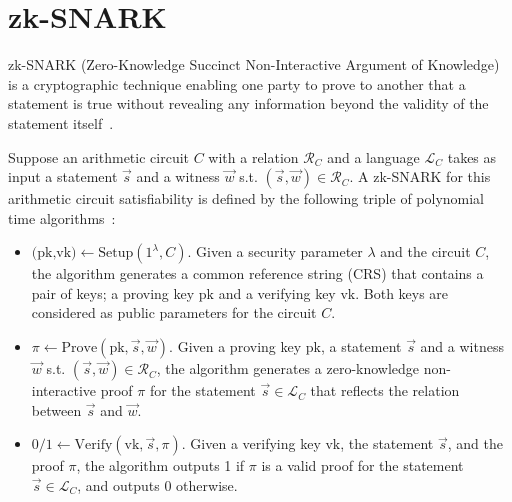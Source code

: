 \documentclass[runningheads]{llncs}
\begin{document}
\section{zk-SNARK}
zk-SNARK (Zero-Knowledge Succinct Non-Interactive Argument of Knowledge) is a cryptographic technique enabling one party to prove to another that a statement is true without revealing any information beyond the validity of the statement itself~\cite{grothSizePairingbasedNoninteractive2016}.

Suppose an arithmetic circuit $C$ with a relation $\mathcal{R}_C$ and a language $\mathcal{L}_C$ takes as input a statement $\vec{s}$ and a witness $\vec{w}$ s.t. $(\vec{s}, \vec{w}) \in \mathcal{R}_C$. A zk-SNARK for this arithmetic circuit satisfiability is defined by the following triple of polynomial time algorithms~\cite{grothSizePairingbasedNoninteractive2016,parnoPinocchioNearlyPractical2013}:
\begin{itemize}
    \item $\textrm{(pk,vk)} \gets \textrm{Setup}(1^\lambda,C)$. Given a security parameter $\lambda$ and the circuit $C$, the algorithm generates a common reference string (CRS) that contains a pair of keys; a proving key $\textrm{pk}$ and a verifying key $\textrm{vk}$. Both keys are considered as public parameters for the circuit $C$.
    \item $\pi \gets \textrm{Prove}(\textrm{pk}, \vec{s}, \vec{w})$. Given a proving key $\textrm{pk}$, a statement $\vec{s}$ and a witness $\vec{w}$ s.t. $(\vec{s}, \vec{w}) \in \mathcal{R}_C$, the algorithm generates a zero-knowledge non-interactive proof $\pi$ for the statement $\vec{s} \in \mathcal{L}_C$ that reflects the relation between $\vec{s}$ and $\vec{w}$.
    \item $0/1 \gets \textrm{Verify}(\textrm{vk}, \vec{s}, \pi)$. Given a verifying key $\textrm{vk}$, the statement $\vec{s}$, and the proof $\pi$, the algorithm outputs 1 if $\pi$ is  a valid proof for the statement $\vec{s} \in \mathcal{L}_C$, and outputs 0 otherwise.
\end{itemize}
\end{document}

